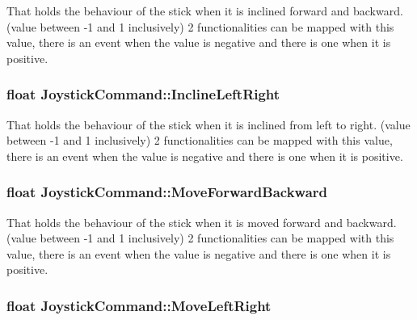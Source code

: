 That holds the behaviour of the stick when it is inclined forward and backward. (value between -\/1 and 1 inclusively) 2 functionalities can be mapped with this value, there is an event when the value is negative and there is one when it is positive. 

\subsubsection[{\texorpdfstring{Incline\+Left\+Right}{InclineLeftRight}}]{\setlength{\rightskip}{0pt plus 5cm}float Joystick\+Command\+::\+Incline\+Left\+Right}\hypertarget{structJoystickCommand_a357b7ffd95720084658487aee12662c8}{}\label{structJoystickCommand_a357b7ffd95720084658487aee12662c8}


That holds the behaviour of the stick when it is inclined from left to right. (value between -\/1 and 1 inclusively) 2 functionalities can be mapped with this value, there is an event when the value is negative and there is one when it is positive. 

\subsubsection[{\texorpdfstring{Move\+Forward\+Backward}{MoveForwardBackward}}]{\setlength{\rightskip}{0pt plus 5cm}float Joystick\+Command\+::\+Move\+Forward\+Backward}\hypertarget{structJoystickCommand_a9ca8ffe74ba1717de22528f71b0e5592}{}\label{structJoystickCommand_a9ca8ffe74ba1717de22528f71b0e5592}


That holds the behaviour of the stick when it is moved forward and backward. (value between -\/1 and 1 inclusively) 2 functionalities can be mapped with this value, there is an event when the value is negative and there is one when it is positive. 

\subsubsection[{\texorpdfstring{Move\+Left\+Right}{MoveLeftRight}}]{\setlength{\rightskip}{0pt plus 5cm}float Joystick\+Command\+::\+Move\+Left\+Right}\hypertarget{structJoystickCommand_a6ca311d7940ce3c7ea6e9a3719388181}{}\label{structJoystickCommand_a6ca311d7940ce3c7ea6e9a3719388181}


